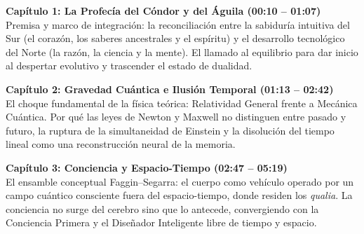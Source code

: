 \documentclass[10pt]{article}
\newenvironment{extraer}[1]{}{}
\begin{document}
	\noindent
	\begin{minipage}[t]{0.492\textwidth}
		\begin{tcolorbox}[contentStyle, width=\textwidth, equal height group=pagina2]
			\fontsize{7.2pt}{8.5pt}\selectfont\color{textgray}
			
			{\small\color{deepblue}\bfseries\begin{extraer}{cap1_title}Capítulo 1: La Profecía del Cóndor y del Águila {\footnotesize\color{golddark}(00:10 -- 01:07)}\end{extraer}}\\[0.04cm]
			\justifying
			\begin{extraer}{cap1_desc}
				Premisa y marco de integración: la reconciliación entre la sabiduría intuitiva del Sur (el corazón, los saberes ancestrales y el espíritu) y el desarrollo tecnológico del Norte (la razón, la ciencia y la mente). El llamado al equilibrio para dar inicio al despertar evolutivo y trascender el estado de dualidad.
			\end{extraer}
			
			\vspace{0.14cm}
			
			{\small\color{deepblue}\bfseries\begin{extraer}{cap2_title}Capítulo 2: Gravedad Cuántica e Ilusión Temporal {\footnotesize\color{golddark}(01:13 -- 02:42)}\end{extraer}}\\[0.04cm]
			\justifying
			\begin{extraer}{cap2_desc}
				El choque fundamental de la física teórica: Relatividad General frente a Mecánica Cuántica. Por qué las leyes de Newton y Maxwell no distinguen entre pasado y futuro, la ruptura de la simultaneidad de Einstein y la disolución del tiempo lineal como una reconstrucción neural de la memoria.
			\end{extraer}
			
			\vspace{0.14cm}
			
			{\small\color{deepblue}\bfseries\begin{extraer}{cap3_title}Capítulo 3: Conciencia y Espacio-Tiempo {\footnotesize\color{golddark}(02:47 -- 05:19)}\end{extraer}}\\[0.04cm]
			\justifying
			\begin{extraer}{cap3_desc}
				El ensamble conceptual Faggin--Segarra: el cuerpo como vehículo operado por un campo cuántico consciente fuera del espacio-tiempo, donde residen los \textit{qualia}. La conciencia no surge del cerebro sino que lo antecede, convergiendo con la Conciencia Primera y el Diseñador Inteligente libre de tiempo y espacio.
			\end{extraer}
			

\end{tcolorbox}
\end{minipage}
\end{document}
